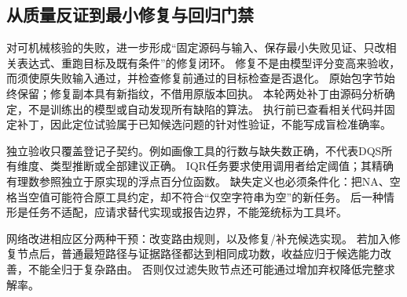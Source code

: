 \subsection{从质量反证到最小修复与回归门禁}
\label{sec:repair-method}
对可机械核验的失败，进一步形成“固定源码与输入、保存最小失败见证、只改相关表达式、重跑目标及既有条件”的修复闭环。
修复不是由模型评分变高来验收，而须使原失败输入通过，并检查修复前通过的目标检查是否退化。
原始包字节始终保留；修复副本具有新指纹，不借用原版本回执。
本轮两处补丁由源码分析确定，不是训练出的模型或自动发现所有缺陷的算法。
执行前已查看相关代码并固定补丁，因此定位试验属于已知候选问题的针对性验证，不能写成盲检准确率。

独立验收只覆盖登记子契约。例如画像工具的行数与缺失数正确，不代表DQS所有维度、类型推断或全部建议正确。
IQR任务要求使用调用者给定阈值；其精确有理数参照独立于原实现的浮点百分位函数。
缺失定义也必须条件化：把NA、空格当空值可能符合原工具约定，却不符合“仅空字符串为空”的新任务。
后一种情形是任务不适配，应请求替代实现或报告边界，不能笼统标为工具坏。

网络改进相应区分两种干预：改变路由规则，以及修复/补充候选实现。
若加入修复节点后，普通最短路径与证据路径都达到相同成功数，收益应归于候选能力改善，不能全归于复杂路由。
否则仅过滤失败节点还可能通过增加弃权降低完整求解率。
